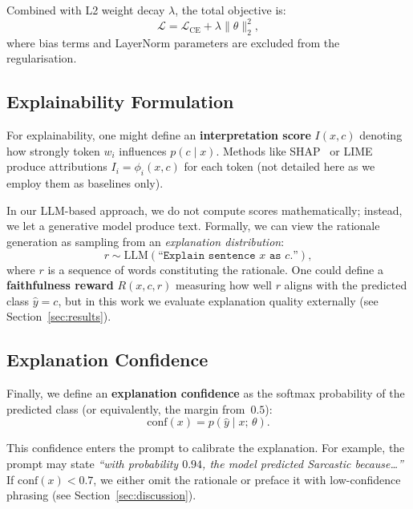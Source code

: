 Combined with L2 weight decay $\lambda$, the total objective is:
\begin{equation}\label{eq:total_loss}
    \mathcal{L} = \mathcal{L}_{\text{CE}} + \lambda \|\theta\|_2^2,
\end{equation}
where bias terms and LayerNorm parameters are excluded from the regularisation.

\subsection{Explainability Formulation}\label{subsec:explainability_formulation}

For explainability, one might define an \textbf{interpretation score} $I(x, c)$ denoting how strongly token $w_i$ influences $p(c \mid x)$. Methods like SHAP~\cite{lundberg2017unified} or LIME~\cite{ribeiro2016why} produce attributions $I_i = \phi_i(x, c)$ for each token (not detailed here as we employ them as baselines only).

In our LLM-based approach, we do not compute scores mathematically; instead, we let a generative model produce text. Formally, we can view the rationale generation as sampling from an \emph{explanation distribution}:
\begin{equation}\label{eq:rationale_generation}
    r \sim \text{LLM}\!\left(\texttt{``Explain sentence } x \texttt{ as } c\texttt{.''}\right),
\end{equation}
where $r$ is a sequence of words constituting the rationale. One could define a \textbf{faithfulness reward} $R(x, c, r)$ measuring how well $r$ aligns with the predicted class $\hat{y} = c$, but in this work we evaluate explanation quality externally (see Section~\ref{sec:results}).

\subsection{Explanation Confidence}\label{subsec:explanation_confidence}

Finally, we define an \textbf{explanation confidence} as the softmax probability of the predicted class (or equivalently, the margin from~$0.5$):
\begin{equation}\label{eq:explanation_confidence}
    \text{conf}(x) = p(\hat{y} \mid x;\, \theta).
\end{equation}

This confidence enters the prompt to calibrate the explanation. For example, the prompt may state \emph{``with probability $0.94$, the model predicted Sarcastic because\ldots''} If $\text{conf}(x) < 0.7$, we either omit the rationale or preface it with low-confidence phrasing (see Section~\ref{sec:discussion}).
